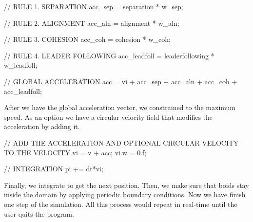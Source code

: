 \begin{cppcode}{0}
// RULE 1. SEPARATION
acc_sep = separation * w_sep;
   
// RULE 2. ALIGNMENT
acc_aln = alignment * w_aln;

// RULE 3. COHESION
acc_coh = cohesion * w_coh;

// RULE 4. LEADER FOLLOWING
acc_leadfoll = leaderfollowing * w_leadfoll;

// GLOBAL ACCELERATION
acc = vi + acc_sep + acc_aln + acc_coh + acc_leadfoll;
\end{cppcode}

After we have the global acceleration vector, we constrained to the maximum speed. As an option we have a circular velocity field that modifies the acceleration by adding it.

\begin{cppcode}{0}
// ADD THE ACCELERATION AND OPTIONAL CIRCULAR VELOCITY TO THE VELOCITY
vi = v + acc;
vi.w = 0.f;

// INTEGRATION
pi += dt*vi; 
\end{cppcode}

Finally, we integrate to get the next position. Then, we make sure that boids stay inside the domain by applying periodic boundary conditions. Now we have finish one step of the simulation. All this process would repeat in real-time until the user quits the program.

